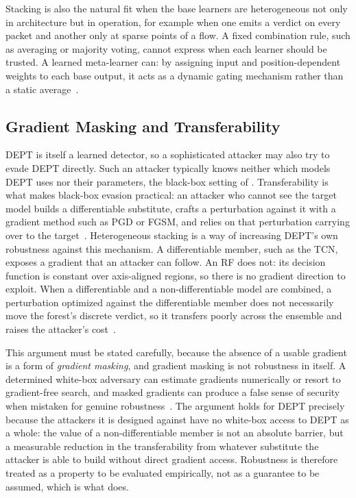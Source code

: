 Stacking is also the natural fit when the base learners are heterogeneous not only in
architecture but in operation, for example when one emits a verdict on every packet and
another only at sparse points of a flow. A fixed combination rule, such as averaging or
majority voting, cannot express when each learner should be trusted. A learned
meta-learner can: by assigning input and position-dependent weights to each base output,
it acts as a dynamic gating mechanism rather than a static
average~\cite{yang2025novel,gungor2022stewart}.

\subsection{Gradient Masking and Transferability}\label{subsec:bg-gradient-masking}
DEPT is itself a learned detector, so a sophisticated attacker may also try to evade DEPT
directly. Such an attacker typically knows neither which models DEPT uses nor their
parameters, the black-box setting of .
Transferability is what makes black-box evasion practical: an attacker who cannot see the
target model builds a differentiable substitute, crafts a perturbation against it with a
gradient method such as \ac{PGD} or \ac{FGSM}, and relies on that perturbation carrying
over to the target~\cite{papernot2017practical}. Heterogeneous stacking is a way of
increasing DEPT's own robustness against this mechanism. A differentiable member, such as the \ac{TCN}, exposes a gradient that an
attacker can follow. An \ac{RF} does not: its decision function is constant over
axis-aligned regions, so there is no gradient direction to exploit. When a differentiable
and a non-differentiable model are combined, a perturbation optimized against the
differentiable member does not necessarily move the forest's discrete verdict, so it
transfers poorly across the ensemble and raises the attacker's
cost~\cite{yang2021trs,gungor2022stewart,biggio2011bagging,chen2022collective}.

This argument must be stated carefully, because the absence of a usable gradient is a form
of \emph{gradient masking}, and gradient masking is not robustness in itself. A
determined white-box adversary can estimate gradients numerically or resort to
gradient-free search, and masked gradients can produce a false sense of
security when mistaken for genuine robustness~\cite{athalye2018obfuscated}. The argument
holds for DEPT precisely because the attackers it is designed against have no white-box
access to DEPT as a whole: the value of a
non-differentiable member is not an absolute barrier, but a measurable reduction in the
transferability from whatever substitute the attacker is able to build without direct
gradient access. Robustness is therefore treated as a property to be evaluated empirically,
not as a guarantee to be assumed, which is what  does.

